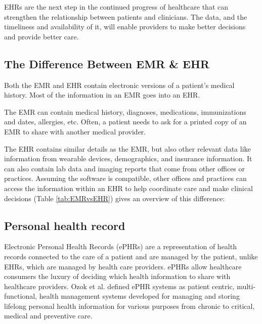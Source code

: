 EHRs are the next step in the continued progress of healthcare that can strengthen the relationship between patients and clinicians.  The data, and the timeliness and availability of it, will enable providers to make better decisions and provide better care\cite{ElectronicHealthRecords}.


\subsection{The Difference Between EMR \& EHR}
Both the EMR and EHR contain electronic versions of a patient's medical history. Most of the information in an EMR goes into an EHR.


The EMR can contain medical history, diagnoses, medications, immunizations and dates, allergies, etc. Often, a patient needs to ask for a printed copy of an EMR to share with another medical provider.


The EHR contains similar details as the EMR, but also other relevant data like information from wearable devices, demographics, and insurance information. It can also contain lab data and imaging reports that come from other offices or practices. Assuming the software is compatible, other offices and practices can access the information within an EHR to help coordinate care and make clinical decisions\cite{KeyMaintainingMedical} (Table \ref{tab:EMRvsEHR}) gives an overview of this difference:



\subsection{Personal health record}
Electronic Personal Health Records (ePHRs) are a representation of health records connected to the care of a patient and are managed by the patient\cite{demirisPatientcenteredApplicationsUse2008}, unlike EHRs, which are managed by health care providers. ePHRs allow healthcare consumers the luxury of deciding which health information to share with healthcare providers\cite{tangPersonalHealthRecords2006}. Ozok et al.\cite{PaperbasedComputerbasedRecords} defined ePHR systems as patient centric, multi-functional, health management systems developed for managing and storing lifelong personal health information for various purposes from chronic to critical, medical and preventive care\cite{alsahafiOverviewElectronicPersonal2018}.

